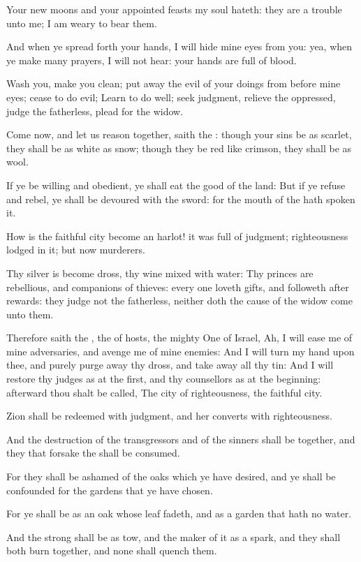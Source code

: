 \verse Your new moons and your appointed feasts my soul hateth: they are a trouble unto me; I am weary to bear them.

\verse And when ye spread forth your hands, I will hide mine eyes from you: yea, when ye make many prayers, I will not hear: your hands are full of blood.

\verse Wash you, make you clean; put away the evil of your doings from before mine eyes; cease to do evil; \verse Learn to do well; seek judgment, relieve the oppressed, judge the fatherless, plead for the widow.

\verse Come now, and let us reason together, saith the \LORD: though your sins be as scarlet, they shall be as white as snow; though they be red like crimson, they shall be as wool.

\verse If ye be willing and obedient, ye shall eat the good of the land: \verse But if ye refuse and rebel, ye shall be devoured with the sword: for the mouth of the \LORD hath spoken it.

\verse How is the faithful city become an harlot! it was full of judgment; righteousness lodged in it; but now murderers.

\verse Thy silver is become dross, thy wine mixed with water: \verse Thy princes are rebellious, and companions of thieves: every one loveth gifts, and followeth after rewards: they judge not the fatherless, neither doth the cause of the widow come unto them.

\verse Therefore saith the \LORD, the \LORD of hosts, the mighty One of Israel, Ah, I will ease me of mine adversaries, and avenge me of mine enemies: \verse And I will turn my hand upon thee, and purely purge away thy dross, and take away all thy tin: \verse And I will restore thy judges as at the first, and thy counsellors as at the beginning: afterward thou shalt be called, The city of righteousness, the faithful city.

\verse Zion shall be redeemed with judgment, and her converts with righteousness.

\verse And the destruction of the transgressors and of the sinners shall be together, and they that forsake the \LORD shall be consumed.

\verse For they shall be ashamed of the oaks which ye have desired, and ye shall be confounded for the gardens that ye have chosen.

\verse For ye shall be as an oak whose leaf fadeth, and as a garden that hath no water.

\verse And the strong shall be as tow, and the maker of it as a spark, and they shall both burn together, and none shall quench them.


